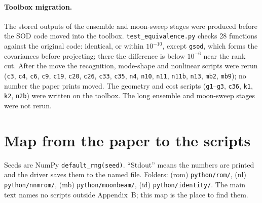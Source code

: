 \documentclass[10pt]{article}
\newcommand{\f}[1]{\texttt{#1}}
\begin{document}
\paragraph{Toolbox migration.} The stored outputs of the ensemble and moon-sweep stages were produced before the SOD code moved into the toolbox. \f{test\_\allowbreak{}equivalence.py} checks 28 functions against the original code: identical, or within $10^{-10}$, except \f{gsod}, which forms the covariances before projecting; there the difference is below $10^{-6}$ near the rank cut. After the move the recognition, mode-shape and nonlinear scripts were rerun (\f{c3}, \f{c4}, \f{c6}, \f{c9}, \f{c19}, \f{c20}, \f{c26}, \f{c33}, \f{c35}, \f{n4}, \f{n10}, \f{n11}, \f{n11b}, \f{n13}, \f{mb2}, \f{mb9}); no number the paper prints moved. The geometry and cost scripts (\f{g1}--\f{g3}, \f{c36}, \f{k1}, \f{k2}, \f{n2b}) were written on the toolbox. The long ensemble and moon-sweep stages were not rerun.

\section{Map from the paper to the scripts}\label{sec:map}
Seeds are NumPy \f{default\_\allowbreak{}rng(seed)}. ``Stdout'' means the numbers are printed and the driver saves them to the named file. Folders: (rom) \f{python/\allowbreak{}rom/\allowbreak{}}, (nl) \f{python/\allowbreak{}nnmrom/\allowbreak{}}, (mb) \f{python/\allowbreak{}moonbeam/\allowbreak{}}, (id) \f{python/\allowbreak{}identity/\allowbreak{}}. The main text names no scripts outside Appendix~B; this map is the place to find them.
\end{document}
